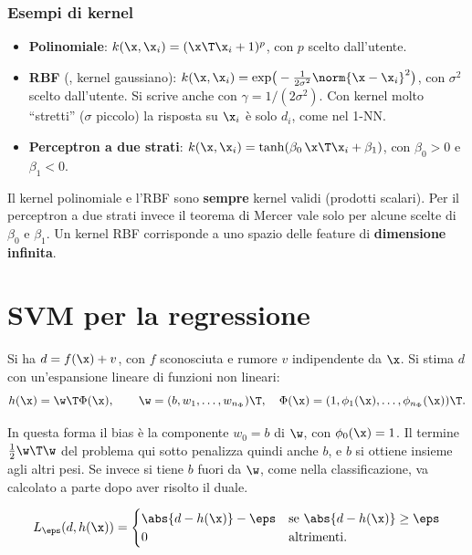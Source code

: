 \subsubsection{Esempi di kernel}
\begin{itemize}
  \item \textbf{Polinomiale}: $k(\x,\x_i) = (\x\T\x_i+1)^p$, con $p$ scelto dall'utente.
  \item \textbf{RBF} (, kernel gaussiano):
        $k(\x,\x_i) = \exp\!\big(-\frac{1}{2\sigma^2}\norm{\x-\x_i}^2\big)$, con $\sigma^2$ scelto dall'utente. Si
        scrive anche con $\gamma = 1/(2\sigma^2)$. Con kernel molto ``stretti'' ($\sigma$ piccolo) la risposta su
        $\x_i$ è solo $d_i$, come nel 1-NN.
  \item \textbf{Perceptron a due strati}: $k(\x,\x_i) = \tanh(\beta_0\,\x\T\x_i+\beta_1)$, con $\beta_0>0$ e
        $\beta_1<0$.
\end{itemize}

\begin{attenzione}
Il kernel polinomiale e l'RBF sono \textbf{sempre} kernel validi (prodotti scalari). Per il perceptron a due
strati invece il teorema di Mercer vale solo per alcune scelte di $\beta_0$ e $\beta_1$. Un kernel RBF corrisponde
a uno spazio delle feature di \textbf{dimensione infinita}.
\end{attenzione}

\section{SVM per la regressione}

Si ha $d = f(\x)+v$, con $f$ sconosciuta e rumore $v$ indipendente da $\x$. Si stima $d$ con un'espansione
lineare di funzioni non lineari:
\[
h(\x) = \w\T\Phi(\x),\qquad \w = (b,w_1,\dots,w_{n_\Phi})\T,\quad \Phi(\x) = (1,\phi_1(\x),\dots,\phi_{n_\Phi}(\x))\T .
\]

\begin{attenzione}
In questa forma il bias è la componente $w_0=b$ di $\w$, con $\phi_0(\x)=1$. Il termine $\frac12\w\T\w$ del
problema qui sotto penalizza quindi anche $b$, e $b$ si ottiene insieme agli altri pesi. Se invece si tiene $b$
fuori da $\w$, come nella classificazione, va calcolato a parte dopo aver risolto il duale.
\end{attenzione}

\begin{definizione}
\[
L_\eps(d,h(\x)) = \begin{cases}\abs{d-h(\x)}-\eps & \text{se }\abs{d-h(\x)}\ge\eps\\ 0 & \text{altrimenti.}\end{cases}
\]
\end{definizione}

